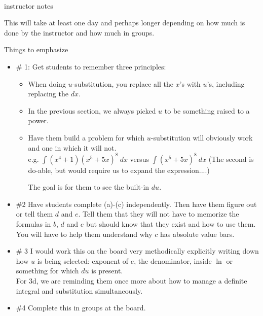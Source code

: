 \documentclass[11pt,fleqn]{article}
\begin{document}
\vspace*{-0.7in}

\begin{center}
  \Large{}\\
  instructor notes
  \end{center}
  
  This will take at least one day and perhaps longer depending on how much is done by the instructor and how much in groups.
  
  Things to emphasize
  
  \begin{itemize}
  \item \# 1: Get students to remember three principles:
  	\begin{itemize}
	\item When doing $u$-substitution, you replace all the $x$'s with $u$'s, including replacing the $dx.$
	\item In the previous section, we always picked $u$ to be something raised to a power.
	\item Have them build a problem for which $u$-substitution will obviously work and one in which it will not.\\
	e.g. $\int (x^4+1)(x^5+5x)^8 \:dx$ versus $\int (x^5+5x)^8 \:dx$ (The second is do-able, but would require us to expand the expression....)
	
	The goal is for them to see the built-in $du$.
	\end{itemize}

	
\item \#2 Have students complete (a)-(c) independently. Then have them figure out or tell them $d$ and $e$. Tell them that they will not have to memorize the formulas in $b$, $d$ and $e$ but should know that they exist and how to use them.\\

You will have to help them understand why $c$ has absolute value bars.

\item \# 3 I would work this on the board very methodically explicitly writing down how $u$ is being selected: exponent of $e$, the denominator, inside $\ln$ or something for which $du$ is present. \\

For 3d, we are reminding them once more about how to manage a definite integral and substitution simultaneously.

\item \#4 Complete this in groups at the board.

	
	
  \end{itemize}
\end{document}
